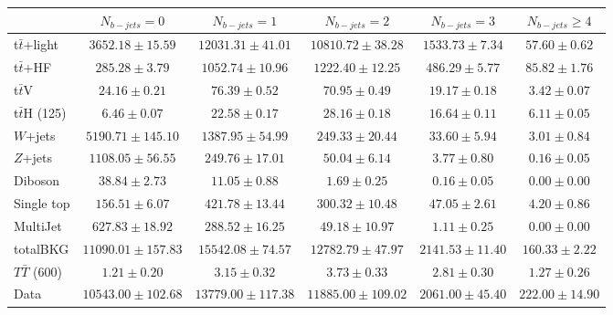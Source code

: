 \begin{tabular}{l c c c c c } \toprule
 & $N_{b-jets}= 0$ & $N_{b-jets}= 1$ & $N_{b-jets}= 2$ & $N_{b-jets}= 3$ & $N_{b-jets}\geq 4$ \\ \midrule 
 t$\bar{t}$+light & $3652.18 \pm 15.59$  & $12031.31 \pm 41.01$  & $10810.72 \pm 38.28$  & $1533.73 \pm 7.34$  & $57.60 \pm 0.62$  \\ 
 t$\bar{t}$+HF & $285.28 \pm 3.79$  & $1052.74 \pm 10.96$  & $1222.40 \pm 12.25$  & $486.29 \pm 5.77$  & $85.82 \pm 1.76$  \\ \midrule 
 t$\bar{t}$V & $24.16 \pm 0.21$  & $76.39 \pm 0.52$  & $70.95 \pm 0.49$  & $19.17 \pm 0.18$  & $3.42 \pm 0.07$  \\ 
 t$\bar{t}$H (125) & $6.46 \pm 0.07$  & $22.58 \pm 0.17$  & $28.16 \pm 0.18$  & $16.64 \pm 0.11$  & $6.11 \pm 0.05$  \\ 
 $W$+jets & $5190.71 \pm 145.10$  & $1387.95 \pm 54.99$  & $249.33 \pm 20.44$  & $33.60 \pm 5.94$  & $3.01 \pm 0.84$  \\ 
 $Z$+jets & $1108.05 \pm 56.55$  & $249.76 \pm 17.01$  & $50.04 \pm 6.14$  & $3.77 \pm 0.80$  & $0.16 \pm 0.05$  \\ 
 Diboson & $38.84 \pm 2.73$  & $11.05 \pm 0.88$  & $1.69 \pm 0.25$  & $0.16 \pm 0.05$  & $0.00 \pm 0.00$  \\ 
 Single top & $156.51 \pm 6.07$  & $421.78 \pm 13.44$  & $300.32 \pm 10.48$  & $47.05 \pm 2.61$  & $4.20 \pm 0.86$  \\ 
 MultiJet & $627.83 \pm 18.92$  & $288.52 \pm 16.25$  & $49.18 \pm 10.97$  & $1.11 \pm 0.25$  & $0.00 \pm 0.00$  \\ \midrule 
 totalBKG & $11090.01 \pm 157.83$  & $15542.08 \pm 74.57$  & $12782.79 \pm 47.97$  & $2141.53 \pm 11.40$  & $160.33 \pm 2.22$  \\ \midrule 
 $T\bar{T}$ (600) & $1.21 \pm 0.20$  & $3.15 \pm 0.32$  & $3.73 \pm 0.33$  & $2.81 \pm 0.30$  & $1.27 \pm 0.26$  \\ \midrule 
 Data & $10543.00 \pm 102.68$  & $13779.00 \pm 117.38$  & $11885.00 \pm 109.02$  & $2061.00 \pm 45.40$  & $222.00 \pm 14.90$  \\ 
 \bottomrule\end{tabular}